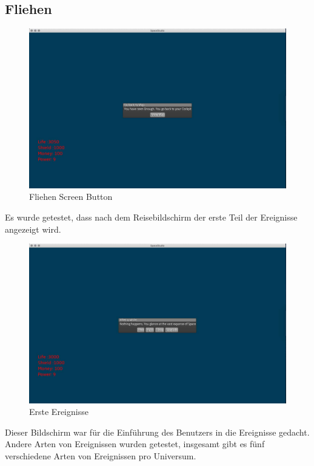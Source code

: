 \documentclass[12pt]{article}
\begin{document}
\subsection{Fliehen}
\begin{figure}[htp]
\centering
\includegraphics[scale=0.4]{TestProtocolBilder/flee.jpg}
\caption{Fliehen Screen Button}
\end{figure}
\newpage
Es wurde getestet, dass nach dem Reisebildschirm der erste Teil der Ereignisse angezeigt wird.\\
\begin{figure}[htp]
\centering
\includegraphics[scale=0.4]{TestProtocolBilder/InitialGeeinisse.jpg}
\caption{Erste Ereignisse}
\end{figure}
\clearpage
Dieser Bildschirm war für die Einführung des Benutzers in die Ereignisse gedacht.\\
Andere Arten von Ereignissen wurden getestet, insgesamt gibt es fünf verschiedene Arten von Ereignissen pro Universum.
\end{document}
